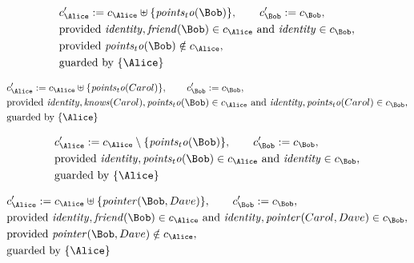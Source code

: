 \begin{align*}
&
c'_
{
\Alice
}
 := 
c_
{
\Alice
}
 \uplus 
\{
\mathit{
points_to
}
(
\Bob
)
\}
, \qquad 
c'_
{
\Bob
}
 := 
c_
{
\Bob
}
,\\
&
\text{provided } 
\mathit{
identity
}
,
\mathit{
friend
}
(
\Bob
)
 \in c_
{
\Alice
}
 \text{ and } 
\mathit{
identity
}
 \in c_
{
\Bob
}
,\\
&
\text{provided } 
\mathit{
points_to
}
(
\Bob
)
 \notin c_
{
\Alice
}
,\\
&
\text{guarded by } \{
\Alice
\}
\end{align*}

\begin{align*}
&
c'_
{
\Alice
}
 := 
c_
{
\Alice
}
 \uplus 
\{
\mathit{
points_to
}
(
Carol
)
\}
, \qquad 
c'_
{
\Bob
}
 := 
c_
{
\Bob
}
,\\
&
\text{provided } 
\mathit{
identity
}
,
\mathit{
knows
}
(
Carol
)
,
\mathit{
points_to
}
(
\Bob
)
 \in c_
{
\Alice
}
 \text{ and } 
\mathit{
identity
}
,
\mathit{
points_to
}
(
Carol
)
 \in c_
{
\Bob
}
,\\
&
\text{guarded by } \{
\Alice
\}
\end{align*}

\begin{align*}
&
c'_
{
\Alice
}
 := 
c_
{
\Alice
}
 \setminus 
\{
\mathit{
points_to
}
(
\Bob
)
\}
, \qquad 
c'_
{
\Bob
}
 := 
c_
{
\Bob
}
,\\
&
\text{provided } 
\mathit{
identity
}
,
\mathit{
points_to
}
(
\Bob
)
 \in c_
{
\Alice
}
 \text{ and } 
\mathit{
identity
}
 \in c_
{
\Bob
}
,\\
&
\text{guarded by } \{
\Alice
\}
\end{align*}

\begin{align*}
&
c'_
{
\Alice
}
 := 
c_
{
\Alice
}
 \uplus 
\{
\mathit{
pointer
}
(
\Bob
,
Dave
)
\}
, \qquad 
c'_
{
\Bob
}
 := 
c_
{
\Bob
}
,\\
&
\text{provided } 
\mathit{
identity
}
,
\mathit{
friend
}
(
\Bob
)
 \in c_
{
\Alice
}
 \text{ and } 
\mathit{
identity
}
,
\mathit{
pointer
}
(
Carol
,
Dave
)
 \in c_
{
\Bob
}
,\\
&
\text{provided } 
\mathit{
pointer
}
(
\Bob
,
Dave
)
 \notin c_
{
\Alice
}
,\\
&
\text{guarded by } \{
\Alice
\}
\end{align*}

